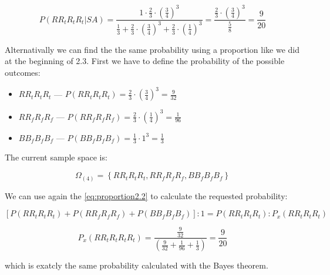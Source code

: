 \documentclass{article}
\begin{document}
\begin{equation} \label{eq:bayesSameAnswer4.3}
P(RR_{t}R_{t}R_{t} | SA) =  \frac { 1 \cdot \frac {2}{3} \cdot \left( \frac{3}{4} \right)^{3} } { \frac {1}{3} + \frac{2}{3} \cdot \left( \frac {3}{4} \right)^{3} + \frac {2}{3} \cdot \left( \frac {1}{4} \right)^{3} } 
	= \frac { \frac {2}{3} \cdot \left ( \frac {3}{4} \right )^{3} } {\frac {5}{8}} =		\frac {9} {20}
\end{equation}


\vspace{20 mm}

Alternativally we can find the the same probability using  a proportion like we did at the beginning of 2.3.
First we have to define the probability of the possible outcomes:

\begin{itemize}
	\item $RR_{t}R_{t}R_{t}$ --- $P(RR_{t}R_{t}R_{t}) = \frac {2} {3} \cdot  \left( \frac{3} {4} \right)^{3} = \frac {9} {32}$
	\item $RR_{f}R_{f}R_{f}$ --- $P(RR_{f}R_{f}R_{f}) = \frac {2} {3} \cdot  \left( \frac{1} {4} \right)^{3} = \frac {1} {96}$
	\item  $BB_{f}B_{f}B_{f}$ --- $P(BB_{f}B_{f}B_{f}) = \frac {1} {3} \cdot 1^{3} = \frac {1} {3}$
\end{itemize}

The current sample space is:

\begin{equation} \label{eq:sampleSpace2.3}
\Omega_{(4)} =  \left\{ RR_{t}R_{t}R_{t}, RR_{f}R_{f}R_{f}, BB_{f}B_{f}B_{f}   \right\}
\end{equation}

We can use again the \eqref{eq:proportion2.2} to calculate the requested probability:

\begin{equation} \label{eq:proportion2.2}
[ P(RR_{t}R_{t}R_{t}) + P(RR_{f}R_{f}R_{f}) + P(BB_{f}B_{f}B_{f}) ] : 1 = P(RR_{t}R_{t}R_{t}) : P_{x}(RR_{t}R_{t}R_{t}) 
\end{equation}

\begin{equation} \label{eq:proportion2.23}
P_{x}(RR_{t}R_{t}R_{t}R_{t}) = \frac  { \frac {9} {32} }  { ( \frac {9} {32} + \frac {1} {96} + \frac {1} {3} ) } = \frac {9} {20}
\end{equation}

which is exatcly the same probability calculated with the Bayes theorem.
\end{document}
